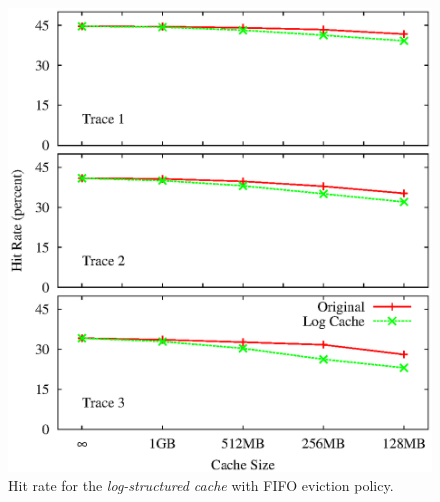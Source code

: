 \documentclass[letterpaper,twocolumn,10pt]{article}
\begin{document}
\begin{figure}[t]
  \begin{center}
    \includegraphics[width=1.04\columnwidth]{graphs/hit-rate-2}
  \end{center}
  \caption{Hit rate for the \emph{log-structured cache} with FIFO eviction
    policy.}
  \label{fig:hit-rate} 
\vspace{-0.2in}
\end{figure}
\end{document}
